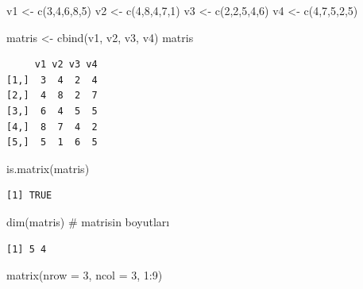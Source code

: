 \documentclass[
  letterpaper,
  DIV=11,
  numbers=noendperiod]{scrreprt}
\newenvironment{Shaded}{\begin{snugshade}}{\end{snugshade}}
\newcommand{\AttributeTok}[1]{\textcolor[rgb]{0.40,0.45,0.13}{#1}}
\newcommand{\CommentTok}[1]{\textcolor[rgb]{0.37,0.37,0.37}{#1}}
\newcommand{\DecValTok}[1]{\textcolor[rgb]{0.68,0.00,0.00}{#1}}
\newcommand{\FunctionTok}[1]{\textcolor[rgb]{0.28,0.35,0.67}{#1}}
\newcommand{\NormalTok}[1]{\textcolor[rgb]{0.00,0.23,0.31}{#1}}
\newcommand{\OtherTok}[1]{\textcolor[rgb]{0.00,0.23,0.31}{#1}}
\newcommand{\SpecialCharTok}[1]{\textcolor[rgb]{0.37,0.37,0.37}{#1}}
\begin{document}
\begin{Shaded}
\begin{Highlighting}[]
\NormalTok{v1 }\OtherTok{\textless{}{-}} \FunctionTok{c}\NormalTok{(}\DecValTok{3}\NormalTok{,}\DecValTok{4}\NormalTok{,}\DecValTok{6}\NormalTok{,}\DecValTok{8}\NormalTok{,}\DecValTok{5}\NormalTok{)}
\NormalTok{v2 }\OtherTok{\textless{}{-}} \FunctionTok{c}\NormalTok{(}\DecValTok{4}\NormalTok{,}\DecValTok{8}\NormalTok{,}\DecValTok{4}\NormalTok{,}\DecValTok{7}\NormalTok{,}\DecValTok{1}\NormalTok{)}
\NormalTok{v3 }\OtherTok{\textless{}{-}} \FunctionTok{c}\NormalTok{(}\DecValTok{2}\NormalTok{,}\DecValTok{2}\NormalTok{,}\DecValTok{5}\NormalTok{,}\DecValTok{4}\NormalTok{,}\DecValTok{6}\NormalTok{)}
\NormalTok{v4 }\OtherTok{\textless{}{-}} \FunctionTok{c}\NormalTok{(}\DecValTok{4}\NormalTok{,}\DecValTok{7}\NormalTok{,}\DecValTok{5}\NormalTok{,}\DecValTok{2}\NormalTok{,}\DecValTok{5}\NormalTok{)}

\NormalTok{matris }\OtherTok{\textless{}{-}} \FunctionTok{cbind}\NormalTok{(v1, v2, v3, v4)}
\NormalTok{matris}
\end{Highlighting}
\end{Shaded}

\begin{verbatim}
     v1 v2 v3 v4
[1,]  3  4  2  4
[2,]  4  8  2  7
[3,]  6  4  5  5
[4,]  8  7  4  2
[5,]  5  1  6  5
\end{verbatim}

\begin{Shaded}
\begin{Highlighting}[]
\FunctionTok{is.matrix}\NormalTok{(matris)}
\end{Highlighting}
\end{Shaded}

\begin{verbatim}
[1] TRUE
\end{verbatim}

\begin{Shaded}
\begin{Highlighting}[]
\FunctionTok{dim}\NormalTok{(matris) }\CommentTok{\# matrisin boyutları}
\end{Highlighting}
\end{Shaded}

\begin{verbatim}
[1] 5 4
\end{verbatim}

\begin{Shaded}
\begin{Highlighting}[]
\FunctionTok{matrix}\NormalTok{(}\AttributeTok{nrow =} \DecValTok{3}\NormalTok{, }\AttributeTok{ncol =} \DecValTok{3}\NormalTok{, }\DecValTok{1}\SpecialCharTok{:}\DecValTok{9}\NormalTok{)}
\end{Highlighting}
\end{Shaded}
\end{document}
